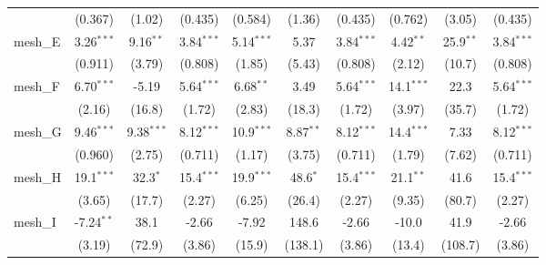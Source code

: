 \begin{tabular}{lccccccccc}
                                                               & (0.367)       & (1.02)         & (0.435)       & (0.584)       & (1.36)         & (0.435)       & (0.762)       & (3.05)         & (0.435)\\   
   mesh\_E                                                     & 3.26$^{***}$  & 9.16$^{**}$    & 3.84$^{***}$  & 5.14$^{***}$  & 5.37           & 3.84$^{***}$  & 4.42$^{**}$   & 25.9$^{**}$    & 3.84$^{***}$\\   
                                                               & (0.911)       & (3.79)         & (0.808)       & (1.85)        & (5.43)         & (0.808)       & (2.12)        & (10.7)         & (0.808)\\   
   mesh\_F                                                     & 6.70$^{***}$  & -5.19          & 5.64$^{***}$  & 6.68$^{**}$   & 3.49           & 5.64$^{***}$  & 14.1$^{***}$  & 22.3           & 5.64$^{***}$\\   
                                                               & (2.16)        & (16.8)         & (1.72)        & (2.83)        & (18.3)         & (1.72)        & (3.97)        & (35.7)         & (1.72)\\   
   mesh\_G                                                     & 9.46$^{***}$  & 9.38$^{***}$   & 8.12$^{***}$  & 10.9$^{***}$  & 8.87$^{**}$    & 8.12$^{***}$  & 14.4$^{***}$  & 7.33           & 8.12$^{***}$\\   
                                                               & (0.960)       & (2.75)         & (0.711)       & (1.17)        & (3.75)         & (0.711)       & (1.79)        & (7.62)         & (0.711)\\   
   mesh\_H                                                     & 19.1$^{***}$  & 32.3$^{*}$     & 15.4$^{***}$  & 19.9$^{***}$  & 48.6$^{*}$     & 15.4$^{***}$  & 21.1$^{**}$   & 41.6           & 15.4$^{***}$\\   
                                                               & (3.65)        & (17.7)         & (2.27)        & (6.25)        & (26.4)         & (2.27)        & (9.35)        & (80.7)         & (2.27)\\   
   mesh\_I                                                     & -7.24$^{**}$  & 38.1           & -2.66         & -7.92         & 148.6          & -2.66         & -10.0         & 41.9           & -2.66\\   
                                                               & (3.19)        & (72.9)         & (3.86)        & (15.9)        & (138.1)        & (3.86)        & (13.4)        & (108.7)        & (3.86)\\   

\end{tabular}
